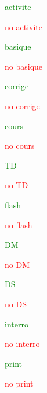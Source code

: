 \documentclass{classe-tex3R-2-1}
\begin{document}
\bigskip

\ifactivite \textcolor{green}{activite}\par \else \hfill \textcolor{red}{no} \textcolor{red}{activite}\par \fi
\ifbasique \textcolor{green}{basique}\par \else \hfill \textcolor{red}{no} \textcolor{red}{basique}\par \fi
\ifcorrige \textcolor{green}{corrige}\par \else \hfill \textcolor{red}{no} \textcolor{red}{corrige}\par \fi
\ifcours \textcolor{green}{cours}\par \else \hfill \textcolor{red}{no} \textcolor{red}{cours}\par \fi
\ifTD \textcolor{green}{TD}\par \else \hfill \textcolor{red}{no} \textcolor{red}{TD}\par \fi
\ifflash \textcolor{green}{flash}\par \else \hfill \textcolor{red}{no} \textcolor{red}{flash}\par \fi
\ifDM \textcolor{green}{DM}\par \else \hfill \textcolor{red}{no} \textcolor{red}{DM}\par \fi
\ifDS \textcolor{green}{DS}\par \else \hfill \textcolor{red}{no} \textcolor{red}{DS}\par \fi
\ifinterro \textcolor{green}{interro}\par \else \hfill \textcolor{red}{no} \textcolor{red}{interro}\par \fi

\bigskip

\ifprint \textcolor{green}{print}\par \else \hfill \textcolor{red}{no} \textcolor{red}{print}\par \fi


\end{document}
